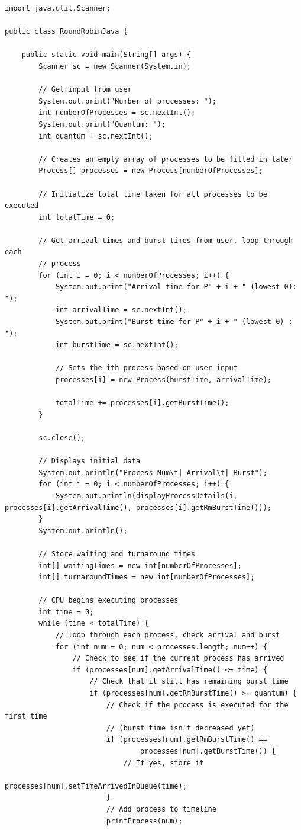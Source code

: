 \documentclass[12pt]{article}
\begin{document}
\begin{lstlisting}
import java.util.Scanner;

public class RoundRobinJava {

	public static void main(String[] args) {
		Scanner sc = new Scanner(System.in);

		// Get input from user
		System.out.print("Number of processes: ");
		int numberOfProcesses = sc.nextInt();
		System.out.print("Quantum: ");
		int quantum = sc.nextInt();

		// Creates an empty array of processes to be filled in later
		Process[] processes = new Process[numberOfProcesses];

		// Initialize total time taken for all processes to be executed
		int totalTime = 0;

		// Get arrival times and burst times from user, loop through each
		// process
		for (int i = 0; i < numberOfProcesses; i++) {
			System.out.print("Arrival time for P" + i + " (lowest 0): ");
			int arrivalTime = sc.nextInt();
			System.out.print("Burst time for P" + i + " (lowest 0) : ");
			int burstTime = sc.nextInt();

			// Sets the ith process based on user input
			processes[i] = new Process(burstTime, arrivalTime);

			totalTime += processes[i].getBurstTime();
		}

		sc.close();

		// Displays initial data
		System.out.println("Process Num\t| Arrival\t| Burst");
		for (int i = 0; i < numberOfProcesses; i++) {
			System.out.println(displayProcessDetails(i, processes[i].getArrivalTime(), processes[i].getRmBurstTime()));
		}
		System.out.println();

		// Store waiting and turnaround times
		int[] waitingTimes = new int[numberOfProcesses];
		int[] turnaroundTimes = new int[numberOfProcesses];

		// CPU begins executing processes
		int time = 0;
		while (time < totalTime) {
			// loop through each process, check arrival and burst
			for (int num = 0; num < processes.length; num++) {
				// Check to see if the current process has arrived
				if (processes[num].getArrivalTime() <= time) {
					// Check that it still has remaining burst time
					if (processes[num].getRmBurstTime() >= quantum) {
						// Check if the process is executed for the first time
						// (burst time isn't decreased yet)
						if (processes[num].getRmBurstTime() ==
								processes[num].getBurstTime()) {
							// If yes, store it
							processes[num].setTimeArrivedInQueue(time);
						}
						// Add process to timeline
						printProcess(num);


\end{lstlisting}
\end{document}
